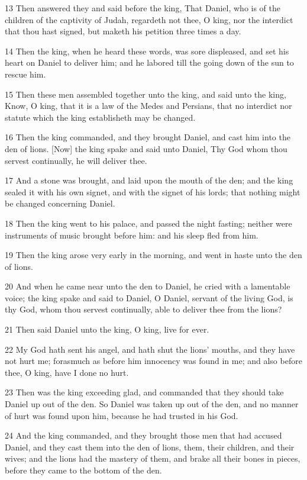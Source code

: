 \par 13 Then answered they and said before the king, That Daniel, who is of the children of the captivity of Judah, regardeth not thee, O king, nor the interdict that thou hast signed, but maketh his petition three times a day.
\par 14 Then the king, when he heard these words, was sore displeased, and set his heart on Daniel to deliver him; and he labored till the going down of the sun to rescue him.
\par 15 Then these men assembled together unto the king, and said unto the king, Know, O king, that it is a law of the Medes and Persians, that no interdict nor statute which the king establisheth may be changed.
\par 16 Then the king commanded, and they brought Daniel, and cast him into the den of lions. [Now] the king spake and said unto Daniel, Thy God whom thou servest continually, he will deliver thee.
\par 17 And a stone was brought, and laid upon the mouth of the den; and the king sealed it with his own signet, and with the signet of his lords; that nothing might be changed concerning Daniel.
\par 18 Then the king went to his palace, and passed the night fasting; neither were instruments of music brought before him: and his sleep fled from him.
\par 19 Then the king arose very early in the morning, and went in haste unto the den of lions.
\par 20 And when he came near unto the den to Daniel, he cried with a lamentable voice; the king spake and said to Daniel, O Daniel, servant of the living God, is thy God, whom thou servest continually, able to deliver thee from the lions?
\par 21 Then said Daniel unto the king, O king, live for ever.
\par 22 My God hath sent his angel, and hath shut the lions' mouths, and they have not hurt me; forasmuch as before him innocency was found in me; and also before thee, O king, have I done no hurt.
\par 23 Then was the king exceeding glad, and commanded that they should take Daniel up out of the den. So Daniel was taken up out of the den, and no manner of hurt was found upon him, because he had trusted in his God.
\par 24 And the king commanded, and they brought those men that had accused Daniel, and they cast them into the den of lions, them, their children, and their wives; and the lions had the mastery of them, and brake all their bones in pieces, before they came to the bottom of the den.
